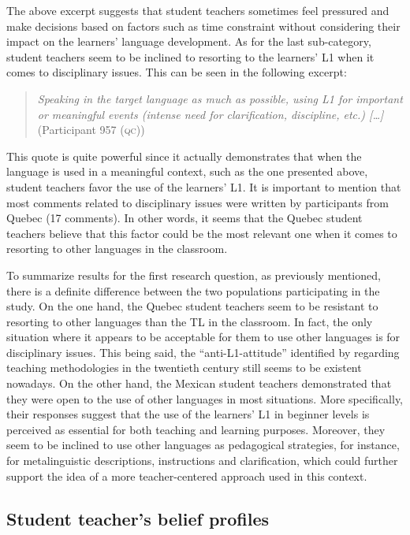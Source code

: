 \documentclass[output=paper]{../langscibook}
\begin{document}
The above excerpt suggests that student teachers sometimes feel pressured and make decisions based on factors such as time constraint without considering their impact on the learners’ language development. As for the last sub-category, student teachers seem to be inclined to resorting to the learners’ L1 when it comes to disciplinary issues. This can be seen in the following excerpt:

\begin{quote}
\emph{Speaking in the target language as much as possible, using L1 for important or meaningful events (intense need for clarification, discipline, etc.) […]} (Participant 957 (\textsc{qc}))
\end{quote}

This quote is quite powerful since it actually demonstrates that when the language is used in a meaningful context, such as the one presented above, student teachers favor the use of the learners’ L1. It is important to mention that most comments related to disciplinary issues were written by participants from Quebec (17 comments). In other words, it seems that the Quebec student teachers believe that this factor could be the most relevant one when it comes to resorting to other languages in the classroom.

To summarize results for the first research question, as previously mentioned, there is a definite difference between the two populations participating in the study. On the one hand, the Quebec student teachers seem to be resistant to resorting to other languages than the TL in the classroom. In fact, the only situation where it appears to be acceptable for them to use other languages is for disciplinary issues. This being said, the “anti-L1-attitude” identified by \citet{Cook2001} regarding teaching methodologies in the twentieth century still seems to be existent nowadays. On the other hand, the Mexican student teachers demonstrated that they were open to the use of other languages in most situations. More specifically, their responses suggest that the use of the learners’ L1 in beginner levels is perceived as essential for both teaching and learning purposes. Moreover, they seem to be inclined to use other languages as pedagogical strategies, for instance, for metalinguistic descriptions, instructions and clarification, which could further support the idea of a more teacher-centered approach used in this context.



\subsection{Student teacher’s belief profiles}
\end{document}

